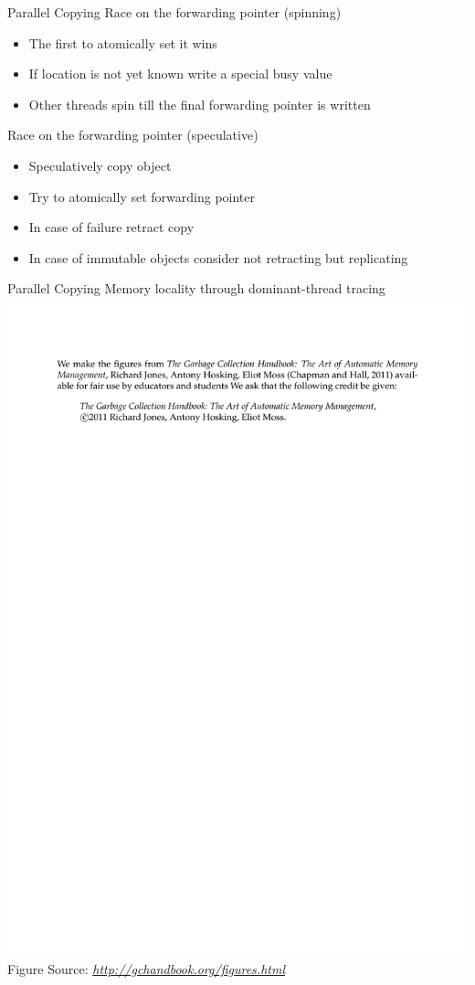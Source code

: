 \documentclass[
14pt,
aspectratio=169,
usenames,
dvipsnames,
x11names]{beamer}
\newcommand{\src}[1]{\scriptsize Figure Source: \textit{#1}}
\begin{document}
\begin{frame}{Parallel Copying}
  \alert{Race} on the forwarding pointer (spinning)
  \begin{itemize}
  \item The first to \alert{atomically} set it wins
  \item If location is not yet known write a special \alert{busy} value
  \item Other threads \alert{spin} till the final forwarding pointer is written
  \end{itemize}
  \vfill
  \alert{Race} on the forwarding pointer (speculative)
  \begin{itemize}
  \item Speculatively copy object
  \item Try to \alert{atomically} set forwarding pointer
  \item In case of failure retract copy
  \item In case of immutable objects consider not retracting but replicating
  \end{itemize}
\end{frame}

\begin{frame}{Parallel Copying}
  Memory locality through \alert{dominant-thread tracing}
  \centering
  \includegraphics[page=68,trim=4cm 9cm 4cm 10cm,height=.65\textheight]{gchandbookfigures}\\
  \src{\url{http://gchandbook.org/figures.html}}
\end{frame}
\end{document}
